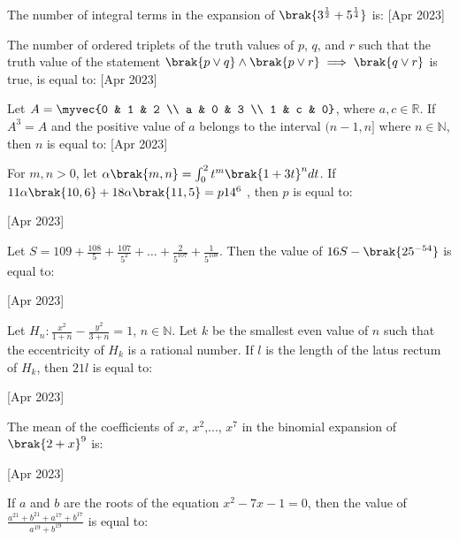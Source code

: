 \iffalse
  \title{August:2021}
  \author{AI24BTECH11016}
  \section{fitb}
\fi
\item 
	The number of integral terms in the expansion of $\brak{3^{\frac{1}{2}} + 5^{\frac{1}{4}}}$ is:
	\hfill [Apr 2023]

	\item 
	The number of ordered triplets of the truth values of $p$, $q$, and $r$ such that the truth value of the statement $\brak{p \lor q} \land \brak{p \lor r} \implies \brak{q \lor r}$ is true, is equal to:
	\hfill [Apr 2023]

	\item
	Let $A = \myvec{0 & 1 & 2 \\ a & 0 & 3 \\ 1 & c & 0}$, where $a, c \in \mathbb{R}$. If $A^{3} = A$ and the positive value of $a$ belongs to the interval $(n-1,n]$ where $n \in \mathbb{N}$, then $n$ is equal to:
	\hfill [Apr 2023]
	
	\item 
	For $m, n > 0$, let $\alpha\brak{m, n} = \int_{0}^{2} t^{m}\brak{1+3t}^{n} dt$. If $11\alpha\brak{10, 6} + 18\alpha\brak{11, 5} = p 14^{6}$ , then $p$ is equal to:
	
	\hfill [Apr 2023]
	
	\item 
	Let $S = 109 + \frac{108}{5} + \frac{107}{5^2} + \dots + \frac{2}{5^{107}} + \frac{1}{5^{108}}$. Then the value of $16S - \brak{25^{-54}}$ is equal to:
	
	\hfill [Apr 2023]
	
	\item 
	Let $H_n:\frac{x^2}{1+n} - \frac{y^2}{3+n} = 1$, $n \in \mathbb{N}$. Let $k$ be the smallest even value of $n$ such that the eccentricity of $H_k$ is a rational number. If $l$ is the length of the latus rectum of $H_k$, then $21l$ is equal to:
	
	\hfill [Apr 2023]
	
	\item
	The mean of the coefficients of $x$, $x^2$,..., $x^7$ in the binomial expansion of $\brak{2 + x}^{9}$ is:
	
	\hfill [Apr 2023]
	
	\item
	If $a$ and $b$ are the roots of the equation $x^{2} - 7x - 1 = 0$, then the value of $\frac{a^{21} + b^{21} + a^{17} + b^{17}}{a^{19} + b^{19}}$ is equal to:
	
